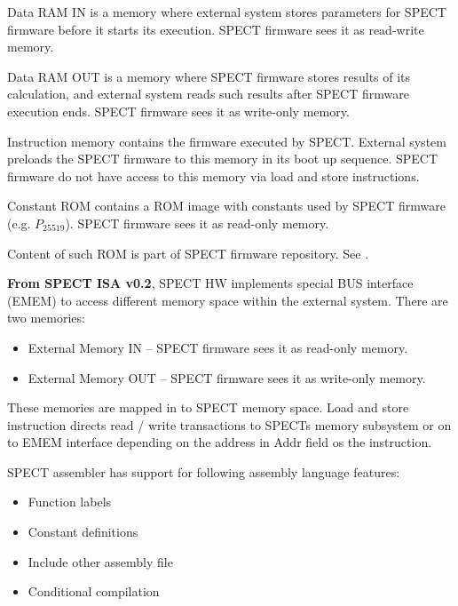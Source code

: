 \documentclass{tropic_design_spec}
\begin{document}

Data RAM IN is a memory where external system stores parameters for SPECT firmware
before it starts its execution. SPECT firmware sees it as read-write memory.


Data RAM OUT is a memory where SPECT firmware stores results of its calculation,
and external system reads such results after SPECT firmware execution ends. SPECT
firmware sees it as write-only memory.


Instruction memory contains the firmware executed by SPECT. External system preloads
the SPECT firmware to this memory in its boot up sequence.
SPECT firmware do not have access to this memory via load and store instructions. 


Constant ROM contains a ROM image with constants used by SPECT firmware (e.g. $P_{25519}$).
SPECT firmware sees it as read-only memory.

Content of such ROM is part of SPECT firmware repository. See \cite{SPECTFW}.


\textbf{From SPECT ISA v0.2}, SPECT HW implements special BUS interface (EMEM) to access different memory space within the external system.
There are two memories:
\begin{itemize}
    \item External Memory IN -- SPECT firmware sees it as read-only memory.
    \item External Memory OUT -- SPECT firmware sees it as write-only memory.
\end{itemize}

These memories are mapped in to SPECT memory space. Load and store instruction directs read / write transactions to
SPECTs memory subsystem or on to EMEM interface depending on the address in Addr field os the instruction.



SPECT assembler has support for following assembly language features:
\begin{itemize}
    \item{Function labels}
    \item{Constant definitions}
    \item{Include other assembly file}
    \item{Conditional compilation}
\end{itemize}
\end{document}
